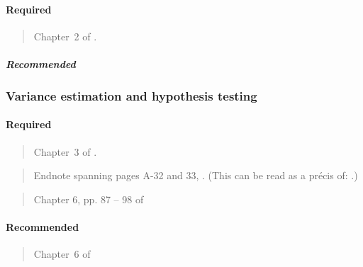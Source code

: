 \documentclass[12pt]{article}
\begin{document}
\paragraph*{Required}

\begin{verse}
  Chapter~2 of .
\end{verse}

\subparagraph{Recommended}

\begin{verse}  \end{verse}
\begin{verse}  \end{verse}

\subsubsection{Variance estimation and hypothesis testing}

\paragraph*{Required}

\begin{verse}
  Chapter~3 of .
\end{verse}

\begin{verse} Endnote spanning pages A-32 and 33,
  .  (This can be read as a pr{\'e}cis
  of: .)
\end{verse}

\begin{verse} Chapter 6, pp. 87 -- 98 of  \end{verse}

\paragraph*{Recommended}

\begin{verse} Chapter~6 of  \end{verse}

\begin{verse}  \end{verse}

\begin{verse}  \end{verse}
\end{document}
